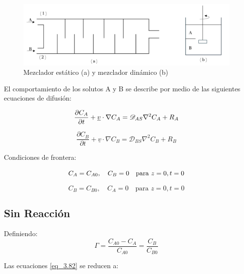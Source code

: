 \begin{figure}[h]

        \includegraphics[width=\linewidth]{Capitulo3/Imagenes/Fig_3.8.png}
        \caption{Mezclador estático (a) y mezclador dinámico (b)}
        \label{fig:Fig_3.8}

\end{figure}
        El comportamiento de los solutos A y B se describe por medio de las siguientes ecuaciones de difusión:




\begin{equation}
    \frac{\partial C_A}{\partial t} + \underline{v} \cdot \nabla C_A = \mathscr{D}_{AS} \nabla^2 C_A + R_A
    \notag
\end{equation}

\begin{equation}
    \frac{\partial C_B}{\partial t} + \underline{v} \cdot \nabla C_B = \mathscr{D}_{BS} \nabla^2 C_B + R_B
    \label{eq_3.82}
\end{equation}




Condiciones de frontera:

\begin{equation}
    C_A = C_{A0}, \quad C_B = 0 \quad \text{para } z=0, t=0
    \notag
\end{equation}

\begin{equation}
    C_B = C_{B0}, \quad C_A = 0 \quad \text{para } z=0, t=0
\end{equation}

\subsection{Sin Reacción}

Definiendo:
\begin{equation}
    \Gamma = \frac{C_{A0} - C_A}{C_{A0}} = \frac{C_B}{C_{B0}}
\end{equation}

Las ecuaciones \eqref{eq_3.82} se reducen a:

